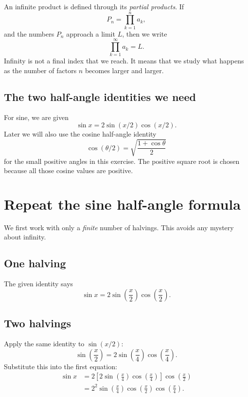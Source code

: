 \documentclass[11pt]{article}
\begin{document}
\begin{definitionBox}
An infinite product is defined through its \emph{partial products}. If
\[
  P_n=\prod_{k=1}^{n}a_k,
\]
and the numbers \(P_n\) approach a limit \(L\), then we write
\[
  \prod_{k=1}^{\infty}a_k=L.
\]
Infinity is not a final index that we reach. It means that we study what happens as the number of factors \(n\) becomes larger and larger.
\end{definitionBox}

\subsection{The two half-angle identities we need}

For sine, we are given
\[
  \boxed{\sin x=2\sin(x/2)\cos(x/2).}
\]
Later we will also use the cosine half-angle identity
\[
  \boxed{\cos(\theta/2)=\sqrt{\frac{1+\cos\theta}{2}}}
\]
for the small positive angles in this exercise. The positive square root is chosen because all those cosine values are positive.

\section{Repeat the sine half-angle formula}

We first work with only a \emph{finite} number of halvings. This avoids any mystery about infinity.

\subsection{One halving}

The given identity says
\[
  \sin x
  =2\sin\!\left(\frac{x}{2}\right)
     \cos\!\left(\frac{x}{2}\right).
\]

\subsection{Two halvings}

Apply the same identity to \(\sin(x/2)\):
\[
  \sin\!\left(\frac{x}{2}\right)
  =2\sin\!\left(\frac{x}{4}\right)
     \cos\!\left(\frac{x}{4}\right).
\]
Substitute this into the first equation:
\begin{align*}
  \sin x
  &=2\left[
      2\sin\!\left(\frac{x}{4}\right)
       \cos\!\left(\frac{x}{4}\right)
     \right]
     \cos\!\left(\frac{x}{2}\right)\\
  &=2^2\sin\!\left(\frac{x}{4}\right)
     \cos\!\left(\frac{x}{2}\right)
     \cos\!\left(\frac{x}{4}\right).
\end{align*}
\end{document}

